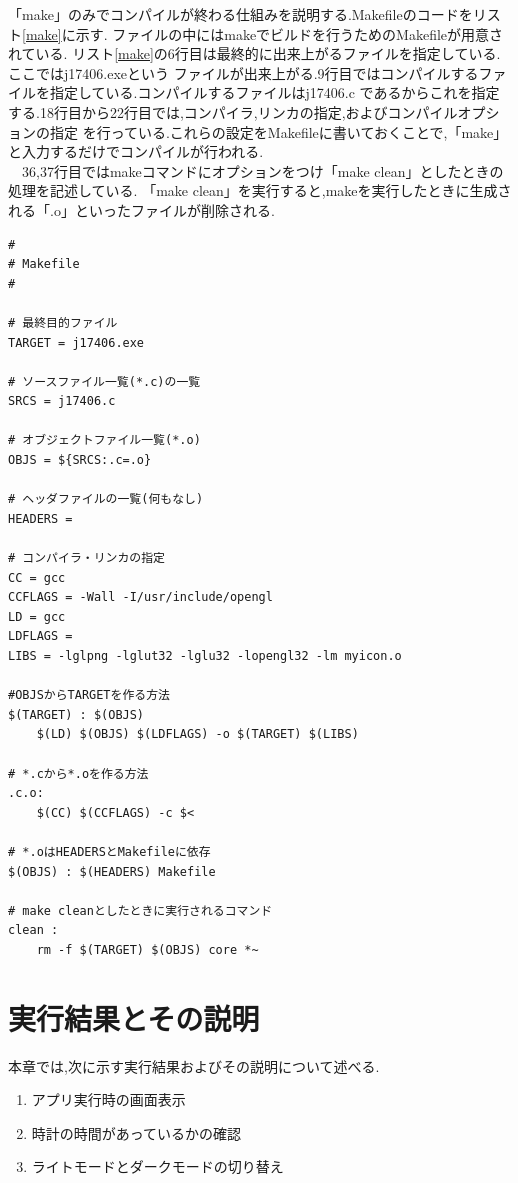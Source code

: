 \documentclass[a4j]{jarticle}
\begin{document}
    「make」のみでコンパイルが終わる仕組みを説明する.Makefileのコードをリスト\ref{make}に示す.
  ファイルの中にはmakeでビルドを行うためのMakefileが用意されている.
  リスト\ref{make}の6行目は最終的に出来上がるファイルを指定している.ここではj17406.exeという
  ファイルが出来上がる.9行目ではコンパイルするファイルを指定している.コンパイルするファイルはj17406.c
  であるからこれを指定する.18行目から22行目では,コンパイラ,リンカの指定,およびコンパイルオプションの指定
  を行っている.これらの設定をMakefileに書いておくことで,「make」と入力するだけでコンパイルが行われる.\\
  　36,37行目ではmakeコマンドにオプションをつけ「make clean」としたときの処理を記述している.
  「make clean」を実行すると,makeを実行したときに生成される「.o」といったファイルが削除される.
    \begin{lstlisting}[basicstyle=\ttfamily\footnotesize, frame=single,label=make,caption=Makefile]
#
# Makefile
#

# 最終目的ファイル
TARGET = j17406.exe

# ソースファイル一覧(*.c)の一覧
SRCS = j17406.c

# オブジェクトファイル一覧(*.o)
OBJS = ${SRCS:.c=.o}

# ヘッダファイルの一覧(何もなし)
HEADERS = 

# コンパイラ・リンカの指定
CC = gcc
CCFLAGS = -Wall -I/usr/include/opengl
LD = gcc
LDFLAGS =
LIBS = -lglpng -lglut32 -lglu32 -lopengl32 -lm myicon.o

#OBJSからTARGETを作る方法
$(TARGET) : $(OBJS)
	$(LD) $(OBJS) $(LDFLAGS) -o $(TARGET) $(LIBS)

# *.cから*.oを作る方法
.c.o:
	$(CC) $(CCFLAGS) -c $<

# *.oはHEADERSとMakefileに依存
$(OBJS) : $(HEADERS) Makefile

# make cleanとしたときに実行されるコマンド
clean :
	rm -f $(TARGET) $(OBJS) core *~
            \end{lstlisting}

    \section{実行結果とその説明}
    本章では,次に示す実行結果およびその説明について述べる.
    \begin{enumerate}
      \item アプリ実行時の画面表示
      \item 時計の時間があっているかの確認
      \item ライトモードとダークモードの切り替え
    \end{enumerate}
\end{document}
